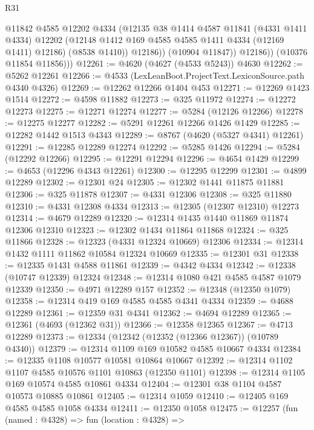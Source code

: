 \begin{lexlean}{R31}
\begin{coremodule}
                  @11842
                  @4585
                  @12202
                  @4334
                  (@12135
                    @38
                    @1414
                    @4587
                    @11841
                    (@4331 @1411 @4334)
                    @12202
                    (@12148 @1412 @169 @4585 @4585 @1411 @4334 (@12169 @1411) @12186)
                    (@8538 @1410))
                  @12186))
              (@10904 @11847))
            @12186))
        (@10376 @11854 @11856)))
@12261 := @4620 (@4627 (@4533 @5243)) @4630
@12262 := @5262 @12261
@12266 := @4533 (LexLeanBoot.ProjectText.LexiconSource.path @4340 @4326)
@12269 := @12262 @12266 @1404 @453
@12271 := @12269 @1423 @1514
@12272 := @4598 @11882
@12273 := @325 @11972
@12274 := @12272 @12273
@12275 := @12271 @12274
@12277 := @5284 (@12126 @12266)
@12278 := @12275 @12277
@12282 := @5291 @12261 @12266 @1426 @1429
@12285 := @12282 @1442 @1513 @4343
@12289 := @8767 (@4620 (@5327 @4341) @12261)
@12291 := @12285 @12289 @12274
@12292 := @5285 @1426
@12294 := @5284 (@12292 @12266)
@12295 := @12291 @12294
@12296 := @4654 @1429
@12299 := @4653 (@12296 @4343 @12261)
@12300 := @12295 @12299
@12301 := @4899 @12289
@12302 := @12301 @24
@12305 := @12302 @1441 @11875 @11881
@12306 := @325 @11878
@12307 := @4331 @12306
@12308 := @325 @11880
@12310 := @4331 @12308 @4334
@12313 := @12305 (@12307 @12310) @12273
@12314 := @4679 @12289
@12320 := @12314 @1435 @1440 @11869 @11874 @12306 @12310
@12323 := @12302 @1434 @11864 @11868
@12324 := @325 @11866
@12328 := @12323 (@4331 @12324 @10669) @12306
@12334 := @12314 @1432 @1111 @11862 @10584 @12324 @10669
@12335 := @12301 @31
@12338 := @12335 @1431 @4588 @11861
@12339 := @4342 @4334
@12342 := @12338 (@10747 @12339) @12324
@12348 := @12314 @1080 @421 @4585 @4587 @1079 @12339
@12350 := @4971 @12289 @157
@12352 := @12348 (@12350 @1079)
@12358 := @12314 @419 @169 @4585 @4585 @4341 @4334
@12359 := @4688 @12289
@12361 := @12359 @31 @4341
@12362 := @4694 @12289
@12365 := @12361 (@4693 (@12362 @31))
@12366 := @12358 @12365
@12367 := @4713 @12289
@12373 := @12334 (@12342 (@12352 (@12366 @12367)) (@10789 @4340))
@12379 := @12314 @1109 @169 @10582 @4585 @10667 @4334
@12384 := @12335 @1108 @10577 @10581 @10864 @10667
@12392 := @12314 @1102 @1107 @4585 @10576 @1101 @10863 (@12350 @1101)
@12398 := @12314 @1105 @169 @10574 @4585 @10861 @4334
@12404 := @12301 @38 @1104 @4587 @10573 @10885 @10861
@12405 := @12314 @1059
@12410 := @12405 @169 @4585 @4585 @1058 @4334
@12411 := @12350 @1058
@12475 := @12257
    (fun (named : @4328) =>
    fun (location : @4328) =>

\end{coremodule}
\end{lexlean}
